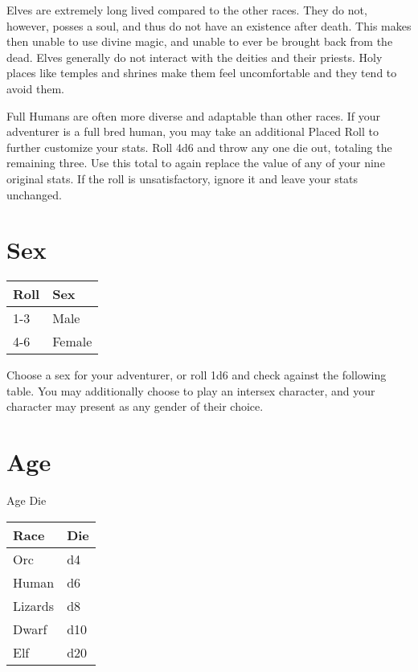 Elves are extremely long lived compared to the other races. They do not, however, posses a soul, and thus do not have an existence after death. This makes then unable to use divine magic, and unable to ever be brought back from the dead. Elves generally do not interact with the deities and their priests. Holy places like temples and shrines make them feel uncomfortable and they tend to avoid them.

Full Humans are often more diverse and adaptable than other races. If your adventurer is a full bred human, you may take an additional Placed Roll to further customize your stats. Roll 4d6 and throw any one die out, totaling the remaining three. Use this total to again replace the value of any of your nine original stats. If the roll is unsatisfactory, ignore it and leave your stats unchanged.
\section{Sex}


\begin{normbox}

\small
\begin{tabular}{@{}l l}
\textbf{Roll} & \textbf{Sex}\\
\midrule
1-3 & Male\\
4-6 & Female
\end{tabular}
\end{normbox}

Choose a sex for your adventurer, or roll 1d6 and check against the following table. You may additionally choose to play an intersex character, and your character may present as any gender of their choice.
\section{Age}


\begin{normbox}{Age Die}
\small

\begin{tabular}{@{}l l}
\textbf{Race} & \textbf{Die}\\
\midrule
Orc & d4\\
Human & d6\\
Lizards &  d8\\
Dwarf & d10\\
Elf &  d20\\
\end{tabular}
\normalsize
\end{normbox}

